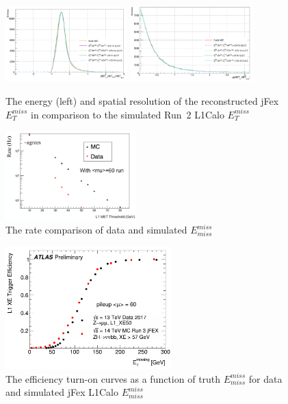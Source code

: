 \begin{figure}[!h]                
	\includegraphics[width=0.42\textwidth]{Chapter6/res_et.png}
	\includegraphics[width=0.42\textwidth]{Chapter6/res_phi.png}
	\begin{center}
		\caption{The energy (left) and spatial resolution of the reconstructed jFex $E^{miss}_{T}$ in comparison to the simulated Run~2 L1Calo $E^{miss}_{T}$}
		\label{Fig:res_met}            
	\end{center}
\end{figure}
\begin{figure}[!h]                
	\includegraphics[width=0.45\textwidth]{Chapter6/rate_datamc.png}
	\begin{center}
		\caption{The rate comparison of data and simulated $E^{miss}_{miss}$}
		\label{Fig:rate_datamc}            
	\end{center}
\end{figure}
\begin{figure}[!h]                
	\includegraphics[width=0.57\textwidth]{Chapter6/perf_met.png}
	\begin{center}
		\caption{The efficiency turn-on curves as a function of truth $E^{miss}_{miss}$ for data and simulated jFex L1Calo $E^{miss}_{miss}$}
		\label{Fig:perf_met}            
	\end{center}
\end{figure}
